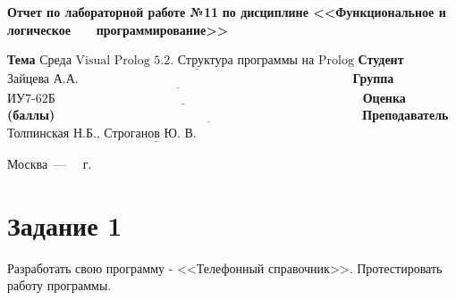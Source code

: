 \documentclass[12pt]{report}
\begin{document}
\begin{titlepage}
		\begin{center}
			\noindent\begin{minipage}{1.1\textwidth}\centering
				\Large\textbf{Отчет по лабораторной работе №11}\newline
				\textbf{по дисциплине <<Функциональное и логическое}\newline
				\textbf{~~~программирование>>}\newline\newline
			\end{minipage}
		\end{center}
		
		\noindent\textbf{Тема} $\underline{\text{Среда Visual Prolog 5.2. Структура программы на Prolog}}$\newline\newline
		\noindent\textbf{Студент} $\underline{\text{Зайцева А.А.~~~~~~~~~~~~~~~~~~~~~~~~~~~~~~~~~~~~~~~~~~~~~~~~~~~~~~~~~~~~~~~~~}}$\newline\newline
		\noindent\textbf{Группа} $\underline{\text{ИУ7-62Б~~~~~~~~~~~~~~~~~~~~~~~~~~~~~~~~~~~~~~~~~~~~~~~~~~~~~~~~~~~~~~~~~~~~~~~~~}}$\newline\newline
		\noindent\textbf{Оценка (баллы)} $\underline{\text{~~~~~~~~~~~~~~~~~~~~~~~~~~~~~~~~~~~~~~~~~~~~~~~~~~~~~~~~~~~~~~~~~~~~~~~~}}$\newline\newline
		\noindent\textbf{Преподаватель} $\underline{\text{Толпинская Н.Б., Строганов Ю. В.~~~~~~~~~~~~~~~~~~~~~~~~~~}}$\newline\newline\newline
		
		\begin{center}
			\vfill
			Москва~---~\the\year
			~г.
		\end{center}
	\end{titlepage}
	

\section*{Задание 1}
 Разработать свою программу - <<Телефонный справочник>>. Протестировать работу программы.
\end{document}
